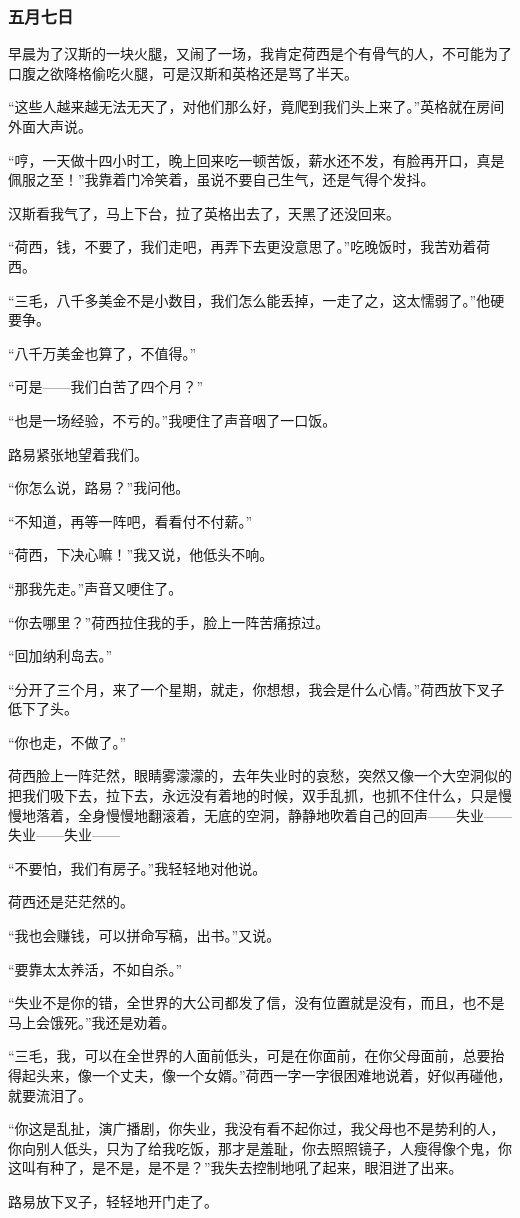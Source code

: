 \subsubsection{五月七日}
\par 早晨为了汉斯的一块火腿，又闹了一场，我肯定荷西是个有骨气的人，不可能为了口腹之欲降格偷吃火腿，可是汉斯和英格还是骂了半天。
\par “这些人越来越无法无天了，对他们那么好，竟爬到我们头上来了。”英格就在房间外面大声说。
\par “哼，一天做十四小时工，晚上回来吃一顿苦饭，薪水还不发，有脸再开口，真是佩服之至！”我靠着门冷笑着，虽说不要自己生气，还是气得个发抖。
\par 汉斯看我气了，马上下台，拉了英格出去了，天黑了还没回来。
\par “荷西，钱，不要了，我们走吧，再弄下去更没意思了。”吃晚饭时，我苦劝着荷西。
\par “三毛，八千多美金不是小数目，我们怎么能丢掉，一走了之，这太懦弱了。”他硬要争。
\par “八千万美金也算了，不值得。”
\par “可是——我们白苦了四个月？”
\par “也是一场经验，不亏的。”我哽住了声音咽了一口饭。
\par 路易紧张地望着我们。
\par “你怎么说，路易？”我问他。
\par “不知道，再等一阵吧，看看付不付薪。”
\par “荷西，下决心嘛！”我又说，他低头不响。
\par “那我先走。”声音又哽住了。
\par “你去哪里？”荷西拉住我的手，脸上一阵苦痛掠过。
\par “回加纳利岛去。”
\par “分开了三个月，来了一个星期，就走，你想想，我会是什么心情。”荷西放下叉子低下了头。
\par “你也走，不做了。”
\par 荷西脸上一阵茫然，眼睛雾濛濛的，去年失业时的哀愁，突然又像一个大空洞似的把我们吸下去，拉下去，永远没有着地的时候，双手乱抓，也抓不住什么，只是慢慢地落着，全身慢慢地翻滚着，无底的空洞，静静地吹着自己的回声——失业——失业——失业——
\par “不要怕，我们有房子。”我轻轻地对他说。
\par 荷西还是茫茫然的。
\par “我也会赚钱，可以拼命写稿，出书。”又说。
\par “要靠太太养活，不如自杀。”
\par “失业不是你的错，全世界的大公司都发了信，没有位置就是没有，而且，也不是马上会饿死。”我还是劝着。
\par “三毛，我，可以在全世界的人面前低头，可是在你面前，在你父母面前，总要抬得起头来，像一个丈夫，像一个女婿。”荷西一字一字很困难地说着，好似再碰他，就要流泪了。
\par “你这是乱扯，演广播剧，你失业，我没有看不起你过，我父母也不是势利的人，你向别人低头，只为了给我吃饭，那才是羞耻，你去照照镜子，人瘦得像个鬼，你这叫有种了，是不是，是不是？”我失去控制地吼了起来，眼泪迸了出来。
\par 路易放下叉子，轻轻地开门走了。

